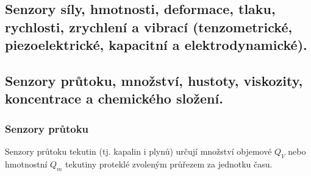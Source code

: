 \subsection{Senzory síly, hmotnosti, deformace, tlaku, rychlosti, zrychlení a vibrací (tenzometrické, piezoelektrické, kapacitní a elektrodynamické).}

\subsection{Senzory průtoku, množství, hustoty, viskozity, koncentrace a chemického složení.}
\subsubsection*{Senzory průtoku}
Senzory průtoku tekutin (tj. kapalin i plynů) určují množství objemové $ Q_V $ nebo hmotnostní $ Q_m $ tekutiny proteklé zvoleným průřezem za jednotku času.

